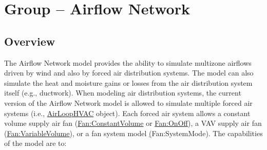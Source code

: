 \section{Group -- Airflow Network}\label{group-airflow-network}

\subsection{Overview}\label{overview}

The Airflow Network model provides the ability to simulate multizone airflows driven by wind and also by forced air distribution systems. The model can also simulate the heat and moisture gains or losses from the air distribution system itself (e.g., ductwork). When modeling air distribution systems, the current version of the Airflow Network model is allowed to simulate multiple forced air systems (i.e., \hyperref[airloophvac]{AirLoopHVAC} object). Each forced air system allows a constant volume supply air fan (\hyperref[fanconstantvolume]{Fan:ConstantVolume} or \hyperref[fanonoff]{Fan:OnOff}), a VAV supply air fan (\hyperref[fanvariablevolume]{Fan:VariableVolume}), or a fan system model \hyperref[fansystemmodel]({Fan:SystemMode}). The capabilities of the model are to:

